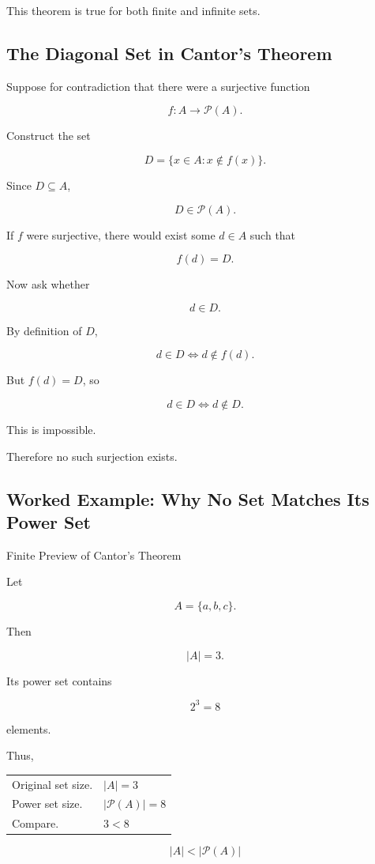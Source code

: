 This theorem is true for both finite and infinite sets.

\subsection{The Diagonal Set in Cantor's Theorem}
\label{subsec:cantor-diagonal-set}

Suppose for contradiction that there were a surjective function

\[ f:A\to\mathcal P(A). \]

Construct the set

\[ D=\{x\in A:x\notin f(x)\}. \]

Since \(D\subseteq A\),

\[ D\in\mathcal P(A). \]

If \(f\) were surjective, there would exist some \(d\in A\) such that

\[ f(d)=D. \]

Now ask whether

\[ d\in D. \]

By definition of \(D\),

\[ d\in D\Longleftrightarrow d\notin f(d). \]

But \(f(d)=D\), so

\[ d\in D\Longleftrightarrow d\notin D. \]

This is impossible.

Therefore no such surjection exists.

\subsection{Worked Example: Why No Set Matches Its Power Set}
\label{subsec:worked-cantor-theorem}

\begin{workedexamplebox}{Finite Preview of Cantor's Theorem}

Let

\[ A=\{a,b,c\}. \]

Then

\[ |A|=3. \]

Its power set contains

\[ 2^3=8 \]

elements.

Thus,

\begin{tabularx}{\textwidth}{@{}>{\raggedright\arraybackslash}p{}X@{}}
Original set size. & \(|A|=3\)\\
Power set size. & \(|\mathcal P(A)|=8\)\\
Compare. & \(3<8\)
\end{tabularx}

\begin{answerbox}
\[ |A|<|\mathcal P(A)| \]
\end{answerbox}
\end{workedexamplebox}

